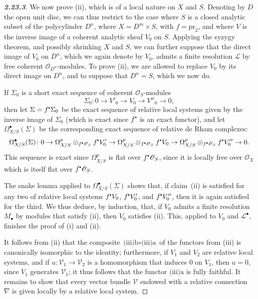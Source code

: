 \documentclass{report}
\theoremstyle{plain}
\theoremstyle{definition}
\newcommand{\sh}{\mathscr}
\newcommand{\sbullet}{{\mathbin{\vcenter{\hbox{\scalebox{.5}{$\bullet$}}}}}}
\newcommand{\pr}{\mathrm{pr}}
\newcommand{\oldpage}[1]{\marginpar{\footnotesize$\Big\vert$ \textit{p.~#1}}}
\begin{document}
\begin{proof}[\normalfont\textbf{2.23.3}]
\label{I.2.23.3}
  We now prove (ii), which is of a local nature on $X$ and $S$.
  Denoting by $D$ the open unit disc, we can thus restrict to the case where $S$ is a closed analytic subset of the polycylinder $D^n$, where $X=D^m\times S$, with $f=\pr_2$, and where $V$ is the inverse image of a coherent analytic sheaf $V_0$ on $S$.
  Applying the syzygy theorem, and possibly shrinking $X$ and $S$, we can further suppose that the direct image of $V_0$ on $D^n$, which we again denote by $V_0$, admits a finite resolution $\sh{L}$ by free coherent $\sh{O}_{D^n}$-modules.
  To prove (ii), we are allowed to replace $V_0$ by its direct image on $D^n$, and to suppose that $D^n=S$, which we now do.

  If $\Sigma_0$ is a short exact sequence of coherent $\sh{O}_S$-modules
  \[
    \Sigma_0\colon 0 \to V'_0 \to V_0 \to V''_0 \to 0,
  \]
  then let $\Sigma=f^\sbullet\Sigma_0$ be the exact sequence of relative local systems given by the inverse image of $\Sigma_0$ (which is exact since $f^\sbullet$ is an exact functor), and let $\Omega_{X/S}^\bullet(\Sigma)$ be the corresponding exact sequence of relative de Rham complexes:
  \[
    \Omega_{X/S}^\bullet(\Sigma)\colon 0 \to \Omega_{X/S}^p\otimes_{f^\sbullet\sh{O}_S}f^\sbullet V'_0 \to \Omega_{X/S}^p\otimes_{f^\sbullet\sh{O}_S}f^\sbullet V_0 \to \Omega_{X/S}^p\otimes_{f^\sbullet\sh{O}_S}f^\sbullet V''_0 \to 0.
  \]
  This sequence is exact since $\Omega_{X/S}^p$ is flat over $f^\sbullet\sh{O}_S$, since it is locally free over $\sh{O}_X$ which is itself flat over $f^\sbullet\sh{O}_S$.

  The snake lemma applied to $\Omega_{X/S}^\bullet(\Sigma)$ shows that, if claim~(ii)
\oldpage{17}
  is satisfied for any two of relative local systems $f^\sbullet V_0$, $f^\sbullet V'_0$, and $f^\sbullet V''_0$, then it is again satisfied for the third.
  We thus deduce, by induction, that, if $V_0$ admits a finite resolution $M_\bullet$ by modules that satisfy (ii), then $V_0$ satisfies (ii).
  This, applied to $V_0$ and $\sh{L}^\bullet$, finishes the proof of (i) and (ii).

  It follows from (ii) that the composite $\mbox{(iii)b}\circ\mbox{(iii)a}$ of the functors from (iii) is canonically isomorphic to the identity;
  furthermore, if $V_1$ and $V_2$ are relative local systems, and if $u\colon\sh{V}_1\to\sh{V}_2$ is a homomorphism that induces $0$ on $V_1$, then $u=0$, since $V_1$ generates $\sh{V}_1$;
  it thus follows that the functor $\mbox{(iii)a}$ is fully faithful.
  It remains to show that every vector bundle $\sh{V}$ endowed with a relative connection $\nabla$ is given locally by a relative local system.


\end{proof}
\end{document}
